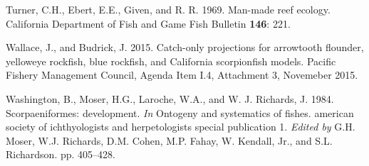 \documentclass[12pt,]{article}
\begin{document}
\hypertarget{ref-Turner1969}{}
Turner, C.H., Ebert, E.E., Given, and R. R. 1969. Man-made reef ecology.
California Department of Fish and Game Fish Bulletin \textbf{146}: 221.

\hypertarget{ref-Wallace2015}{}
Wallace, J., and Budrick, J. 2015. Catch-only projections for arrowtooth
flounder, yelloweye rockfish, blue rockfish, and California scorpionfish
models. Pacific Fishery Management Council, Agenda Item I.4, Attachment
3, Novemeber 2015.

\hypertarget{ref-Washington1984}{}
Washington, B., Moser, H.G., Laroche, W.A., and W. J. Richards, J. 1984.
Scorpaeniformes: development. \emph{In} Ontogeny and systematics of
fishes. american society of ichthyologists and herpetologists special
publication 1. \emph{Edited by} G.H. Moser, W.J. Richards, D.M. Cohen,
M.P. Fahay, W. Kendall, Jr., and S.L. Richardson. pp. 405--428.
\end{document}
